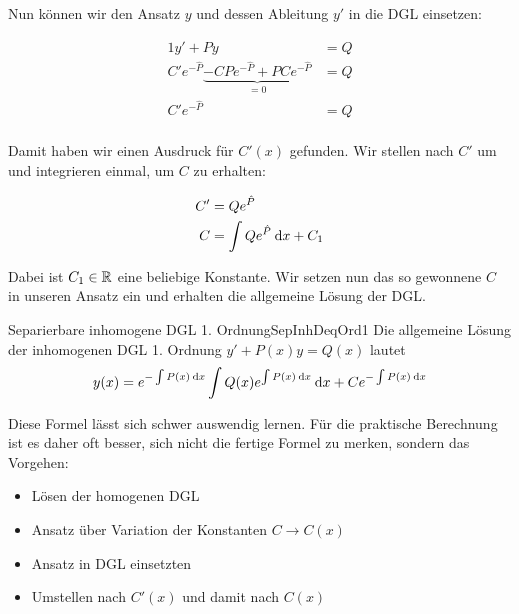 Nun können wir den Ansatz $y$ und dessen Ableitung $y'$ in die DGL einsetzen:

\begin{alignat*}{1}
    y'+Py                                                 &= Q \\
    C' e^{-\hat{P}} \underbrace{- C P e^{-\hat{P}} + P C e^{-\hat{P}}}_{=0} &= Q \\
    C' e^{-\hat{P}} &= Q \\
\end{alignat*}

Damit haben wir einen Ausdruck für $C'(x)$ gefunden. Wir stellen nach $C'$ um und integrieren einmal, um $C$ zu erhalten:

\begin{alignat*}{1}
    C' &= Q e^{\hat{P}} \\
    C  &= \int Q e^{\hat{P}} \:\mathrm{d}{x} + C_1
\end{alignat*}

Dabei ist $C_1 \in \mathbb{R}$ eine beliebige Konstante. Wir setzen nun das so gewonnene $C$ in unseren Ansatz ein und erhalten die allgemeine Lösung der DGL.

\begin{statement}{Separierbare inhomogene DGL 1. Ordnung}{SepInhDeqOrd1}
    Die allgemeine Lösung der inhomogenen DGL 1. Ordnung $y'+P(x)y=Q(x)$ lautet
    $$
        y(x) =  e^{-\int P(x) \:\mathrm{d}{x}} \int Q(x) e^{\int P(x) \:\mathrm{d}{x}} \:\mathrm{d}{x}   + C e^{-\int P(x) \:\mathrm{d}{x}}
    $$
\end{statement}

Diese Formel lässt sich schwer auswendig lernen. Für die praktische Berechnung ist es daher oft besser, sich nicht die fertige Formel zu merken, sondern das Vorgehen:

\begin{itemize}
    \item Lösen der homogenen DGL
    \item Ansatz über Variation der Konstanten $C \to C(x)$
    \item Ansatz in DGL einsetzten
    \item Umstellen nach $C'(x)$ und damit nach $C(x)$
\end{itemize}

